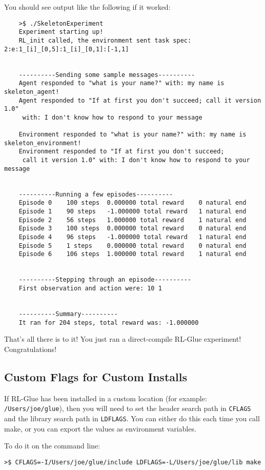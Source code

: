 \documentclass[11pt]{article}
\begin{document}
You should see output like the following if it worked:
\begin{verbatim}
	>$ ./SkeletonExperiment
	Experiment starting up!
	RL_init called, the environment sent task spec: 2:e:1_[i]_[0,5]:1_[i]_[0,1]:[-1,1]


	----------Sending some sample messages----------
	Agent responded to "what is your name?" with: my name is skeleton_agent!
	Agent responded to "If at first you don't succeed; call it version 1.0"
	 with: I don't know how to respond to your message

	Environment responded to "what is your name?" with: my name is skeleton_environment!
	Environment responded to "If at first you don't succeed;
	 call it version 1.0" with: I don't know how to respond to your message


	----------Running a few episodes----------
	Episode 0	 100 steps 	0.000000 total reward	 0 natural end 
	Episode 1	 90 steps 	-1.000000 total reward	 1 natural end 
	Episode 2	 56 steps 	1.000000 total reward	 1 natural end 
	Episode 3	 100 steps 	0.000000 total reward	 0 natural end 
	Episode 4	 96 steps 	-1.000000 total reward	 1 natural end 
	Episode 5	 1 steps 	0.000000 total reward	 0 natural end 
	Episode 6	 106 steps 	1.000000 total reward	 1 natural end 


	----------Stepping through an episode----------
	First observation and action were: 10 1


	----------Summary----------
	It ran for 204 steps, total reward was: -1.000000
\end{verbatim}

That's all there is to it! You just ran a direct-compile RL-Glue experiment! Congratulations!

\subsection{Custom Flags for Custom Installs}
\label{sec:custom-flags}
If RL-Glue has been installed in a custom location (for example: \texttt{/Users/joe/glue}), then you will
need to set the header search path in \texttt{CFLAGS} and the library search path in \texttt{LDFLAGS}.  You can either do this each time you call make, 
or you can export the values as environment variables.

To do it on the command line:
\begin{verbatim}
>$ CFLAGS=-I/Users/joe/glue/include LDFLAGS=-L/Users/joe/glue/lib make
\end{verbatim}
\end{document}
